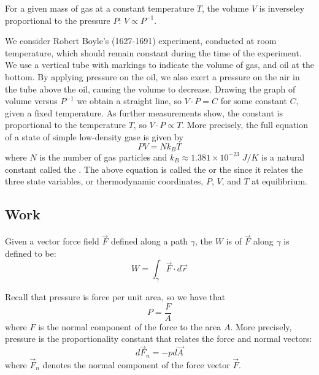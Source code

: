 \documentclass[12pt, a4paper, oneside, openright, titlepage]{book}
\begin{document}
\begin{law}
    For a given mass of gas at a constant temperature $T$, the volume $V$ is inverseley proportional to the pressure $P$: $V \propto P^{-1}$.
\end{law}

We consider Robert Boyle's (1627-1691) experiment, conducted at room temperature, which should remain constant during the time of the experiment. We use a vertical tube with markings to indicate the volume of gas, and oil at the bottom. By applying pressure on the oil, we also exert a pressure on the air in the tube above the oil, causing the volume to decrease. Drawing the graph of volume versus $P^{-1}$ we obtain a straight line, so $V\cdot P = C$ for some constant $C$, given a fixed temperature. As further measurements show, the constant is proportional to the temperature $T$, so $V\cdot P \propto T$. More precisely, the full equation of a state of simple low-density gase is given by \begin{equation}
    \boxed{PV = Nk_BT}
\end{equation}
where $N$ is the number of gas particles and $k_B \approx 1.381\times 10^{-23}\;J/K$ is a natural constant called the . The above equation is called the  or the  since it relates the three state variables, or thermodynamic coordinates, $P$, $V$, and $T$ at equilibrium.





\subsection{Work}

\begin{defn}
    Given a vector force field $\vec{F}$ defined along a path $\gamma$, the  $W$ is of $\vec{F}$ along $\gamma$ is defined to be: \begin{equation}
        W = \int_{\gamma}\vec{F}\cdot d\vec{r}
    \end{equation}
\end{defn}

\begin{rec}
    Recall that pressure is force per unit area, so we have that \begin{equation*}
        P = \frac{F}{A}
    \end{equation*}
    where $F$ is the normal component of the force to the area $A$. More precisely, pressure is the proportionality constant that relates the force and normal vectors: \begin{equation*}
        d\vec{F}_n = -pd\vec{A}
    \end{equation*}
    where $\vec{F}_n$ denotes the normal component of the force vector $\vec{F}$.
\end{rec}
\end{document}
